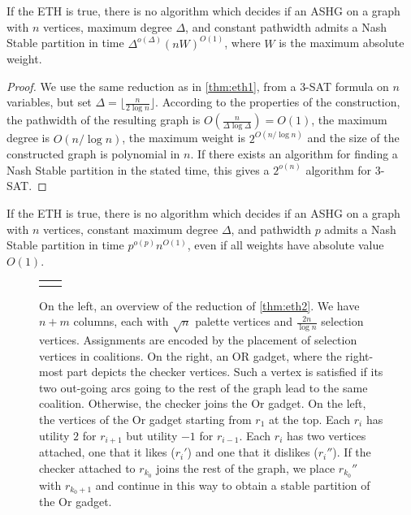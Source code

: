 \documentclass[letterpaper,USenglish,cleveref, autoref, thm-restate]{lipics-v2021}
\begin{document}
\begin{corollary}\label{cor:eth1} If the ETH is true, there is no algorithm
which decides if an ASHG on a graph with $n$ vertices, maximum degree $\Delta$,
and constant pathwidth admits a Nash Stable partition in time
$\Delta^{o(\Delta)}(nW)^{O(1)}$, where $W$ is the maximum absolute weight.
\end{corollary}

\begin{proof}

We use the same reduction as in \cref{thm:eth1}, from a \textsc{3-SAT} formula
on $n$ variables, but set $\Delta = \lfloor \frac{n}{2\log n}\rfloor$.
According to the properties of the construction, the pathwidth of the resulting
graph is $O(\frac{n}{\Delta\log\Delta}) = O(1)$, the maximum degree is
$O(n/\log n)$, the maximum weight is $2^{O(n/\log n)}$ and the size of the
constructed graph is polynomial in $n$. If there exists an algorithm for
finding a Nash Stable partition in the stated time, this gives a $2^{o(n)}$
algorithm for \textsc{3-SAT}.  \end{proof}


\begin{theorem}\label{thm:eth2} If the ETH is true, there is no algorithm which
decides if an ASHG on a graph with $n$ vertices, constant maximum degree
$\Delta$, and pathwidth $p$ admits a Nash Stable partition in time
$p^{o(p)}n^{O(1)}$, even if all weights have absolute value $O(1)$.
\end{theorem}


\begin{figure}[h] \begin{tabular}{l|l}  & 
\end{tabular} \caption{On the left, an overview of the reduction of
\cref{thm:eth2}. We have $n+m$ columns, each with $\sqrt{n}$ palette vertices
and $\frac{2n}{\log n}$ selection vertices. Assignments are encoded by the
placement of selection vertices in coalitions.  On the right, an OR gadget,
where the right-most part depicts the checker vertices. Such a vertex is
satisfied if its two out-going arcs going to the rest of the graph lead to the
same coalition.  Otherwise, the checker joins the Or gadget. On the left, the
vertices of the Or gadget starting from $r_1$ at the top. Each $r_i$ has
utility $2$ for $r_{i+1}$ but utility $-1$ for $r_{i-1}$. Each $r_i$ has two
vertices attached, one that it likes ($r_i'$) and one that it dislikes
($r_i''$). If the checker attached to $r_{k_0}$ joins the rest of the graph, we
place $r_{k_0}''$ with $r_{k_0+1}$ and continue in this way to obtain a stable
partition of the Or gadget.}\label{fig2} \end{figure}
\end{document}
